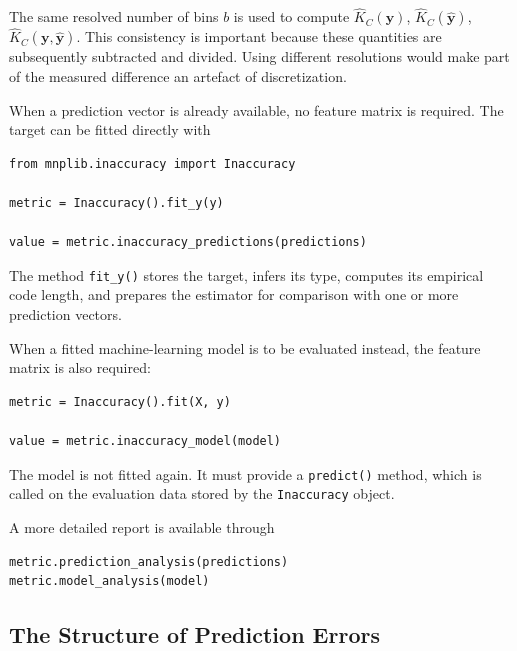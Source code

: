 The same resolved number of bins $b$ is used to compute $\hat K_C(\mathbf{y})$, $\hat K_C(\hat{\mathbf{y}})$, $\hat K_C(\mathbf{y},\hat{\mathbf{y}})$. This consistency is important because these quantities are subsequently
subtracted and divided. Using different resolutions would make part of the measured difference an artefact of discretization. 

When a prediction vector is already available, no feature matrix is required. The target can be fitted directly with

\begin{sourcecode}
{\scriptsize \begin{verbatim}
from mnplib.inaccuracy import Inaccuracy

metric = Inaccuracy().fit_y(y)

value = metric.inaccuracy_predictions(predictions)
\end{verbatim}}
\end{sourcecode}

The method \texttt{fit\_y()} stores the target, infers its type, computes its empirical code length, and prepares the estimator for comparison with one or more prediction vectors.

When a fitted machine-learning model is to be evaluated instead, the feature matrix is also required:

\begin{sourcecode}
{\scriptsize \begin{verbatim}
metric = Inaccuracy().fit(X, y)

value = metric.inaccuracy_model(model)
\end{verbatim}}
\end{sourcecode}

The model is not fitted again. It must provide a \texttt{predict()} method, which is called on the evaluation data stored by the \texttt{Inaccuracy} object.

A more detailed report is available through

\begin{sourcecode}
{\scriptsize \begin{verbatim}
metric.prediction_analysis(predictions)
metric.model_analysis(model)
\end{verbatim}}
\end{sourcecode}

\subsection*{The Structure of Prediction Errors}

